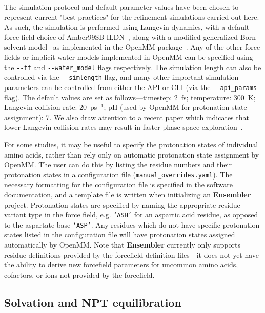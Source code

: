 \documentclass[aps,pre,twocolumn,nofootinbib,superscriptaddress,linenumbers]{revtex4-1}
\begin{document}
The simulation protocol and default parameter values have been chosen to represent current "best practices" for the refinement simulations carried out here.
As such, the simulation is performed using Langevin dynamics, with a default force field choice of Amber99SB-ILDN~\cite{amber99sb-ildn}, along with a modified generalized Born solvent model~\cite{gbsa-obc1} as implemented in the OpenMM package~\cite{eastman:jctc:2012:openmm}.
Any of the other force fields or implicit water models implemented in OpenMM can be specified using the {\tt -{}-ff} and {\tt -{}-water\_model} flags respectively.
The simulation length can also be controlled via the {\tt -{}-simlength} flag, and many other important simulation parameters can be controlled from either the API or CLI (via the {\tt -{}-api\_params} flag).
The default values are set as follows---timestep: 2~fs; temperature: 300~K; Langevin collision rate: 20~ps$^{-1}$; pH (used by OpenMM for protonation state assignment): 7.
We also draw attention to a recent paper which indicates that lower Langevin collision rates may result in faster phase space exploration~\cite{basconi:jctc:2013:collision-rates}.

\color{red}
For some studies, it may be useful to specify the protonation states of individual amino acids, rather than rely only on automatic protonation state assignment by OpenMM.
The user can do this by listing the residue numbers and their protonation states in a configuration file ({\tt manual\_overrides.yaml}).
The necessary formatting for the configuration file is specified in the software documentation, and a template file is written when initializing an {\bf Ensembler} project.
Protonation states are specified by naming the appropriate residue variant type in the force field, e.g. {\tt `ASH'} for an aspartic acid residue, as opposed to the aspartate base {\tt `ASP'}.
Any residues which do not have specific protonation states listed in the configuration file will have protonation states assigned automatically by OpenMM.
\color{red}
Note that {\bf Ensembler} currently only supports residue definitions provided by the forcefield definition files---it does not yet have the ability to derive new forcefield parameters for uncommon amino acids, cofactors, or ions not provided by the forcefield.
\color{black}

\subsection{Solvation and NPT equilibration}
\end{document}
